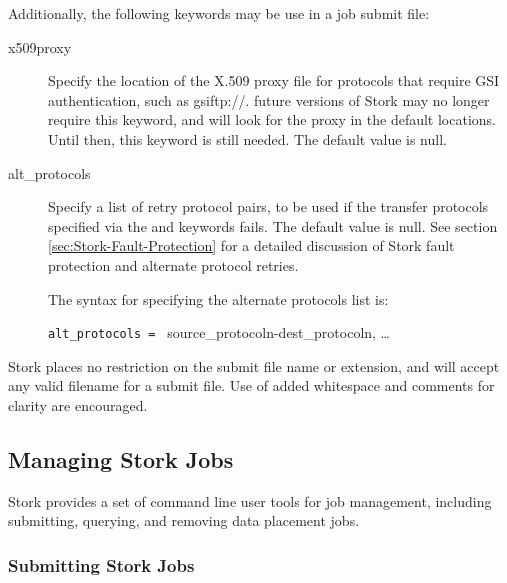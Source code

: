 Additionally, the following keywords may be use in a job submit file:

\begin{description}
	\item[x509proxy] Specify the location of the X.509 proxy file for protocols
    that require GSI authentication, such as gsiftp://.  future versions of
    Stork may no longer require this keyword, and will look for the proxy in
    the default locations.  Until then, this keyword is still needed.  The
    default value is null.

    \item[alt\_protocols] Specify a list of retry protocol pairs, to be used if
    the transfer protocols specified via the  and
     keywords fails.  The default value is null.  See
    section \ref{sec:Stork-Fault-Protection} for a detailed discussion of Stork
    fault protection and alternate protocol retries.

    The syntax for specifying the alternate protocols list is:

    \texttt{alt\_protocols = }
        source\_protocoln-dest\_protocoln,
        \ldots


\end{description}

Stork places no restriction on the submit file name or extension, and will
accept any valid filename for a submit file.  Use of added whitespace and
comments for clarity are encouraged.

\subsection{\label{sec:Stork-Job-Management}Managing Stork Jobs}
Stork provides a set of command line user tools for job management, including
submitting, querying, and removing data placement jobs.

\subsubsection{\label{sec:stork-submit}Submitting Stork Jobs}


